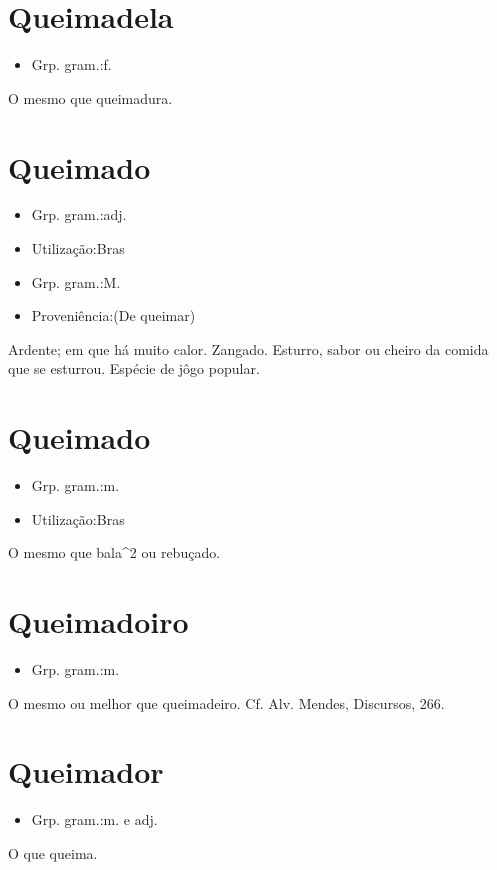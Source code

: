\section{Queimadela}
\begin{itemize}
\item {Grp. gram.:f.}
\end{itemize}
O mesmo que \textunderscore queimadura\textunderscore .
\section{Queimado}
\begin{itemize}
\item {Grp. gram.:adj.}
\end{itemize}
\begin{itemize}
\item {Utilização:Bras}
\end{itemize}
\begin{itemize}
\item {Grp. gram.:M.}
\end{itemize}
\begin{itemize}
\item {Proveniência:(De \textunderscore queimar\textunderscore )}
\end{itemize}
Ardente; em que há muito calor.
Zangado.
Esturro, sabor ou cheiro da comida que se esturrou.
Espécie de jôgo popular.
\section{Queimado}
\begin{itemize}
\item {Grp. gram.:m.}
\end{itemize}
\begin{itemize}
\item {Utilização:Bras}
\end{itemize}
O mesmo que \textunderscore bala\textunderscore ^2 ou \textunderscore rebuçado\textunderscore .
\section{Queimadoiro}
\begin{itemize}
\item {Grp. gram.:m.}
\end{itemize}
O mesmo ou melhor que \textunderscore queimadeiro\textunderscore . Cf. Alv. Mendes, \textunderscore Discursos\textunderscore , 266.
\section{Queimador}
\begin{itemize}
\item {Grp. gram.:m.  e  adj.}
\end{itemize}
O que queima.

